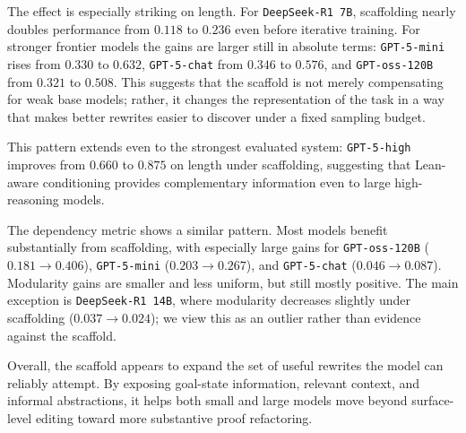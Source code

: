 The effect is especially striking on length. For \texttt{DeepSeek-R1 7B}, scaffolding nearly doubles performance from $0.118$ to $0.236$ even before iterative training. For stronger frontier models the gains are larger still in absolute terms: \texttt{GPT-5-mini} rises from $0.330$ to $0.632$, \texttt{GPT-5-chat} from $0.346$ to $0.576$, and \texttt{GPT-oss-120B} from $0.321$ to $0.508$. This suggests that the scaffold is not merely compensating for weak base models; rather, it changes the representation of the task in a way that makes better rewrites easier to discover under a fixed sampling budget.

This pattern extends even to the strongest evaluated system: \texttt{GPT-5-high} improves from $0.660$ to $0.875$ on length under scaffolding, suggesting that Lean-aware conditioning provides complementary information even to large high-reasoning models.

The dependency metric shows a similar pattern. Most models benefit substantially from scaffolding, with especially large gains for \texttt{GPT-oss-120B} ($0.181 \to 0.406$), \texttt{GPT-5-mini} ($0.203 \to 0.267$), and \texttt{GPT-5-chat} ($0.046 \to 0.087$). Modularity gains are smaller and less uniform, but still mostly positive. The main exception is \texttt{DeepSeek-R1 14B}, where modularity decreases slightly under scaffolding ($0.037 \to 0.024$); we view this as an outlier rather than evidence against the scaffold.

Overall, the scaffold appears to expand the set of useful rewrites the model can reliably attempt. By exposing goal-state information, relevant context, and informal abstractions, it helps both small and large models move beyond surface-level editing toward more substantive proof refactoring.

